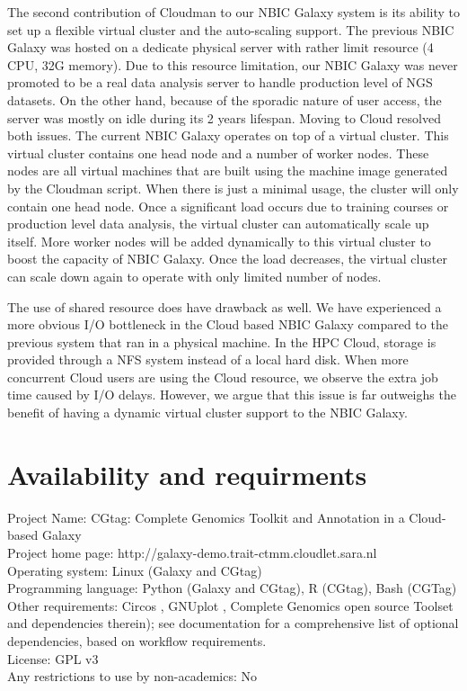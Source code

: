 The second contribution of Cloudman to our NBIC Galaxy system is its ability to set up a flexible virtual cluster and the auto-scaling support. The previous NBIC Galaxy was hosted on a dedicate physical server with rather limit resource (4 CPU, 32G memory). Due to this resource limitation, our NBIC Galaxy was never promoted to be a real data analysis server to handle production level of NGS datasets. On the other hand, because of the sporadic nature of user access, the server was mostly on idle during its 2 years lifespan. Moving to Cloud resolved both issues. The current NBIC Galaxy operates on top of a virtual cluster. This virtual cluster contains one head node and a number of worker nodes. These nodes are all virtual machines that are built using the machine image generated by the Cloudman script. When there is just a minimal usage, the cluster will only contain one head node. Once a significant load occurs due to training courses or production level data analysis, the virtual cluster can automatically scale up itself. More worker nodes will be added dynamically to this virtual cluster to boost the capacity of NBIC Galaxy. Once the load decreases, the virtual cluster can scale down again to operate with only limited number of nodes.



The use of shared resource does have drawback as well. We have experienced a more obvious I/O bottleneck in the Cloud based NBIC Galaxy compared to the previous system that ran in a physical machine. In the HPC Cloud, storage is provided through a NFS system instead of a local hard disk. When more concurrent Cloud users are using the Cloud resource, we observe the extra job time caused by I/O delays. However, we argue that this issue is far outweighs the benefit of having a dynamic virtual cluster support to the NBIC Galaxy.




\section*{Availability and requirments}

Project Name: CGtag: Complete Genomics Toolkit and Annotation in a Cloud-based Galaxy\\
Project home page: http://galaxy-demo.trait-ctmm.cloudlet.sara.nl\\
Operating system: Linux (Galaxy and CGtag)\\
Programming language: Python (Galaxy and CGtag), R (CGtag), Bash (CGTag) \\
Other requirements: Circos \cite{url-circos}, GNUplot \cite{url-gnuplot}, Complete Genomics open source Toolset \cite{url-cgatools}  and dependencies therein);  see documentation for a comprehensive list of optional dependencies, based on workflow requirements.\\
License: GPL v3\\
Any restrictions to use by non-academics: No\\



